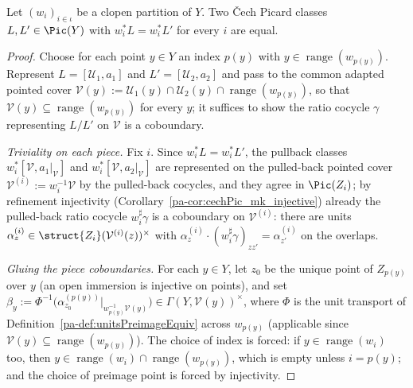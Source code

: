 \begin{theorem}
  \label{pa-thm:cechPic_clopen_separation}
  \leanok

  Let \((w_i)_{i \in \iota}\) be a clopen partition of \(Y\). Two \v Cech Picard classes
  \(L, L' \in \Pic(Y)\) with \(w_i^{*} L = w_i^{*} L'\) for every \(i\) are equal.
\end{theorem}
\begin{proof}
  \leanok
  Choose for each point \(y \in Y\) an index \(p(y)\) with \(y \in \operatorname{range}(w_{p(y)})\).
  Represent \(L = [\mathcal U_1, a_1]\) and \(L' = [\mathcal U_2, a_2]\) and pass to the common
  adapted pointed cover \(\mathcal V(y) := \mathcal U_1(y) \cap \mathcal U_2(y) \cap
  \operatorname{range}(w_{p(y)})\), so that \(\mathcal V(y) \subseteq \operatorname{range}(w_{p(y)})\)
  for every \(y\); it suffices to show the ratio cocycle \(\gamma\) representing \(L/L'\) on
  \(\mathcal V\) is a coboundary.

  \emph{Triviality on each piece.} Fix \(i\). Since \(w_i^{*}L = w_i^{*}L'\), the pullback classes
  \(w_i^{*}[\mathcal V, a_1|_{\mathcal V}]\) and \(w_i^{*}[\mathcal V, a_2|_{\mathcal V}]\) are
  represented on the pulled-back pointed cover \(\mathcal V^{(i)} := w_i^{-1}\mathcal V\) by the
  pulled-back cocycles, and they agree in \(\Pic(Z_i)\); by refinement injectivity
  (Corollary~\ref{pa-cor:cechPic_mk_injective}) already the pulled-back ratio cocycle
  \(w_i^{\sharp}\gamma\) is a coboundary on \(\mathcal V^{(i)}\): there are units
  \(\alpha^{(i)}_z \in \struct{Z_i}(\mathcal V^{(i)}(z))^{\times}\) with
  \(\alpha^{(i)}_z \cdot (w_i^{\sharp}\gamma)_{zz'} = \alpha^{(i)}_{z'}\) on the overlaps.

  \emph{Gluing the piece coboundaries.} For each \(y \in Y\), let \(z_0\) be the unique point of
  \(Z_{p(y)}\) over \(y\) (an open immersion is injective on points), and set
  \(\beta_y := \Phi^{-1}\bigl(\alpha^{(p(y))}_{z_0}|_{w_{p(y)}^{-1}\mathcal V(y)}\bigr) \in
  \Gamma(Y, \mathcal V(y))^{\times}\), where \(\Phi\) is the unit transport of
  Definition~\ref{pa-def:unitsPreimageEquiv} across \(w_{p(y)}\) (applicable since
  \(\mathcal V(y) \subseteq \operatorname{range}(w_{p(y)})\)). The choice of index is forced: if
  \(y \in \operatorname{range}(w_i)\) too, then \(y \in \operatorname{range}(w_i) \cap
  \operatorname{range}(w_{p(y)})\), which is empty unless \(i = p(y)\); and the choice of preimage
  point is forced by injectivity.


\end{proof}
